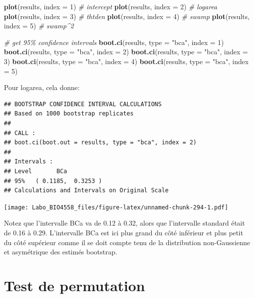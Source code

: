 \documentclass[
  12pt,
]{book}
\newenvironment{Shaded}{\begin{snugshade}}{\end{snugshade}}
\newcommand{\CommentTok}[1]{\textcolor[rgb]{0.56,0.35,0.01}{\textit{#1}}}
\newcommand{\DataTypeTok}[1]{\textcolor[rgb]{0.13,0.29,0.53}{#1}}
\newcommand{\DecValTok}[1]{\textcolor[rgb]{0.00,0.00,0.81}{#1}}
\newcommand{\KeywordTok}[1]{\textcolor[rgb]{0.13,0.29,0.53}{\textbf{#1}}}
\newcommand{\NormalTok}[1]{#1}
\newcommand{\StringTok}[1]{\textcolor[rgb]{0.31,0.60,0.02}{#1}}
\begin{document}
\begin{Shaded}
\begin{Highlighting}[]
\KeywordTok{plot}\NormalTok{(results, }\DataTypeTok{index =} \DecValTok{1}\NormalTok{) }\CommentTok{\# intercept}
\KeywordTok{plot}\NormalTok{(results, }\DataTypeTok{index =} \DecValTok{2}\NormalTok{) }\CommentTok{\# logarea}
\KeywordTok{plot}\NormalTok{(results, }\DataTypeTok{index =} \DecValTok{3}\NormalTok{) }\CommentTok{\# thtden}
\KeywordTok{plot}\NormalTok{(results, }\DataTypeTok{index =} \DecValTok{4}\NormalTok{) }\CommentTok{\# swamp}
\KeywordTok{plot}\NormalTok{(results, }\DataTypeTok{index =} \DecValTok{5}\NormalTok{) }\CommentTok{\# swamp\^{}2}

\CommentTok{\# get 95\% confidence intervals}
\KeywordTok{boot.ci}\NormalTok{(results, }\DataTypeTok{type =} \StringTok{"bca"}\NormalTok{, }\DataTypeTok{index =} \DecValTok{1}\NormalTok{)}
\KeywordTok{boot.ci}\NormalTok{(results, }\DataTypeTok{type =} \StringTok{"bca"}\NormalTok{, }\DataTypeTok{index =} \DecValTok{2}\NormalTok{)}
\KeywordTok{boot.ci}\NormalTok{(results, }\DataTypeTok{type =} \StringTok{"bca"}\NormalTok{, }\DataTypeTok{index =} \DecValTok{3}\NormalTok{)}
\KeywordTok{boot.ci}\NormalTok{(results, }\DataTypeTok{type =} \StringTok{"bca"}\NormalTok{, }\DataTypeTok{index =} \DecValTok{4}\NormalTok{)}
\KeywordTok{boot.ci}\NormalTok{(results, }\DataTypeTok{type =} \StringTok{"bca"}\NormalTok{, }\DataTypeTok{index =} \DecValTok{5}\NormalTok{)}
\end{Highlighting}
\end{Shaded}

Pour logarea, cela donne:

\begin{verbatim}
## BOOTSTRAP CONFIDENCE INTERVAL CALCULATIONS
## Based on 1000 bootstrap replicates
## 
## CALL : 
## boot.ci(boot.out = results, type = "bca", index = 2)
## 
## Intervals : 
## Level       BCa          
## 95%   ( 0.1185,  0.3253 )  
## Calculations and Intervals on Original Scale
\end{verbatim}

\texttt{[image: Labo\_BIO4558\_files/figure-latex/unnamed-chunk-294-1.pdf]}

Notez que l'intervalle BCa va de 0.12 à 0.32, alors que l'intervalle standard était de 0.16 à 0.29. L'intervalle BCa est ici plus grand du côté inférieur et plus petit du côté supérieur comme il se doit compte tenu de la distribution non-Gaussienne et asymétrique des estimés bootstrap.

\hypertarget{perm_reg_mult}{%
\section{Test de permutation}\label{perm_reg_mult}}
\end{document}
